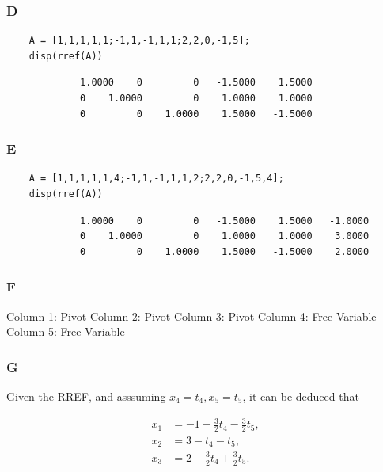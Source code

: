 \documentclass{article}
\begin{document}
\subsubsection*{D}

\begin{verbatim}
    A = [1,1,1,1,1;-1,1,-1,1,1;2,2,0,-1,5];
    disp(rref(A))
    \end{verbatim}
\color{lightgray}
\begin{verbatim}
             1.0000    0         0   -1.5000    1.5000
             0    1.0000         0    1.0000    1.0000    
             0         0    1.0000    1.5000   -1.5000    
\end{verbatim}
\color{black}

\subsubsection*{E}

\begin{verbatim}
    A = [1,1,1,1,1,4;-1,1,-1,1,1,2;2,2,0,-1,5,4];
    disp(rref(A))
    \end{verbatim}
\color{lightgray}
\begin{verbatim}
             1.0000    0         0   -1.5000    1.5000   -1.0000
             0    1.0000         0    1.0000    1.0000    3.0000
             0         0    1.0000    1.5000   -1.5000    2.0000
\end{verbatim}
\color{black}

\subsubsection*{F}

Column 1: Pivot
Column 2: Pivot
Column 3: Pivot
Column 4: Free Variable
Column 5: Free Variable

\subsubsection*{G}

Given the RREF, and asssuming $x_4 = t_4, x_5 = t_5$, it can be deduced that

\[
	\begin{aligned}
		x_1 & = -1 + \frac{3}{2}t_4 - \frac{3}{2}t_5, \\
		x_2 & = 3 - t_4 - t_5,                        \\
		x_3 & = 2 - \frac{3}{2}t_4 + \frac{3}{2}t_5.
	\end{aligned}
\]
\end{document}
